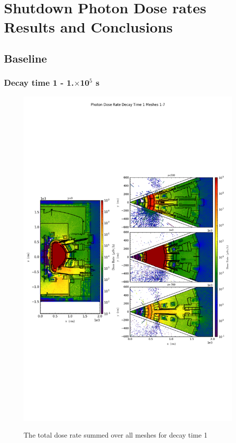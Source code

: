 \documentclass[12pt]{article}
\begin{document}
\section{Shutdown Photon Dose rates Results and Conclusions}
\subsection{Baseline}
\subsubsection{Decay time 1 - 1.$\times$10$^5$ s}
\begin{figure}[ht!]
\centering
\includegraphics[trim={0cm 9cm 0cm 10cm},clip,scale=0.75]{../plots/final_model_nob4c/Photon_Dose_Rate_Decay_Time_1_Meshes_1-7.png}
\label{fig:photons_dc1_no4bc_total}
\caption{The total dose rate summed over all meshes for decay time 1}
\end{figure}
\end{document}
